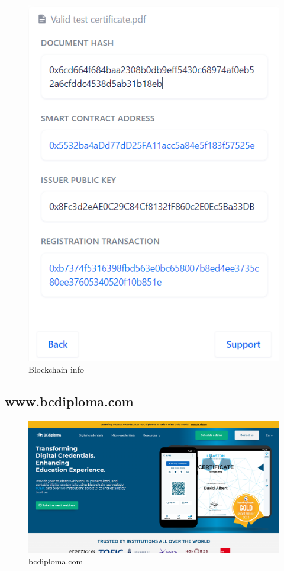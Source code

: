 \enskip \enskip \enskip 
\graphicspath{ {./images/} }
\begin{figure}[htbp]
  \centering 
  \includegraphics[scale=0.3]{9.png}
  \caption[Blockchain info]{Blockchain info}
  \label{7}
\end{figure}


\subsection{www.bcdiploma.com~\cite{bcdiploma}}

\graphicspath{ {./images/} }
\begin{figure}[htbp]
  \centering 
  \includegraphics[scale=0.3]{bcdiploma.png}
  \caption[bcdiploma.com]{bcdiploma.com}
  \label{bcdiploma}
\end{figure}

